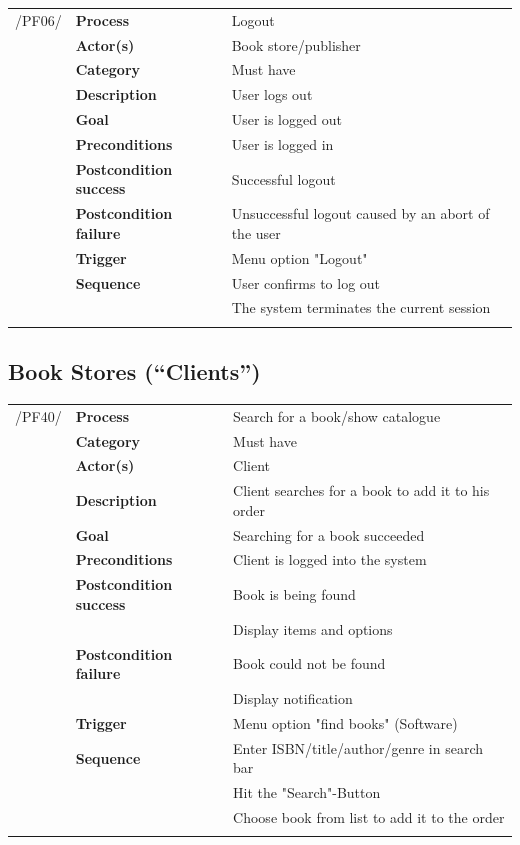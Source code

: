 \documentclass[11pt,a4paper,oneside,svgnames]{report}
\begin{document}
\noindent
\begin{tabular}{p{1.5cm}p{3cm}p{8cm}}
/PF06/	& \textbf{Process} & Logout\\
		& \textbf{Actor(s)} & Book store/publisher\\
		& \textbf{Category} & Must have\\
		& \textbf{Description}	 & User logs out\\
		& \textbf{Goal} & User is logged out\\
		& \textbf{Preconditions} & User is logged in\\
		& \textbf{Postcondition success} & Successful logout\\
		& \textbf{Postcondition failure} & Unsuccessful logout caused by an abort of the user\\
		& \textbf{Trigger} & Menu option "Logout"\\
		& \textbf{Sequence} & User confirms to log out\\
		& & The system terminates the current session\\
\hfill \\
\end{tabular}


\subsection{Book Stores (``Clients'')}

\noindent
\begin{tabular}{p{1.5cm}p{3cm}p{8cm}}
	 /PF40/	& \textbf{Process} & Search for a book/show catalogue\\ 
		& \textbf{Category} & Must have\\
		& \textbf{Actor(s)} & Client\\ 
		& \textbf{Description}	 & Client searches for a book to add it to his order\\ 
		& \textbf{Goal} & Searching for a book succeeded\\
		& \textbf{Preconditions} & Client is logged into the system\\
		& \textbf{Postcondition success} & Book is being found\\
		& & Display items and options\\
		& \textbf{Postcondition failure} & Book could not be found\\
		& & Display notification\\
		& \textbf{Trigger} & Menu option "find books" (Software)\\
		& \textbf{Sequence} & Enter ISBN/title/author/genre in search bar\\
		& & Hit the "Search"-Button\\
		& & Choose book from list to add it to the order\\
\hfill \\
\end{tabular}
\end{document}
